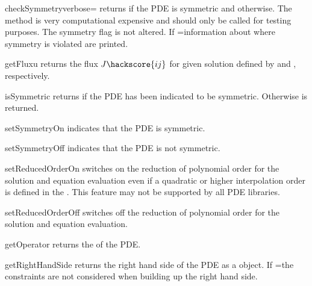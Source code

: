 \begin{methoddesc}[LinearPDE]{checkSymmetry}{verbose=\False}
returns \True if the PDE is symmetric and \False otherwise.
The method is very computational expensive and should only be
called for testing purposes. The symmetry flag is not altered.
If =\True information about where symmetry is violated
are printed.
\end{methoddesc}

\begin{methoddesc}[LinearPDE]{getFlux}{u}
returns the flux $J\hackscore{ij}$  for given solution 
defined by  and , respectively.
\end{methoddesc}


\begin{methoddesc}[LinearPDE]{isSymmetric}{}
returns \True if the PDE has been indicated to be symmetric.
Otherwise \False is returned.
\end{methoddesc}

\begin{methoddesc}[LinearPDE]{setSymmetryOn}{}
indicates that the PDE is symmetric.
\end{methoddesc}

\begin{methoddesc}[LinearPDE]{setSymmetryOff}{}
indicates that the PDE is not symmetric.
\end{methoddesc}

\begin{methoddesc}[LinearPDE]{setReducedOrderOn}{}
switches on the reduction of polynomial order for the solution and equation evaluation even if
a quadratic or higher interpolation order is defined in the \Domain. This feature may not
be supported by all PDE libraries.
\end{methoddesc}

\begin{methoddesc}[LinearPDE]{setReducedOrderOff}{}
switches off the reduction of polynomial order for the solution and
equation evaluation.
\end{methoddesc}

\begin{methoddesc}[LinearPDE]{getOperator}{}
returns the \Operator of the PDE.
\end{methoddesc}

\begin{methoddesc}[LinearPDE]{getRightHandSide}{}
returns the right hand side of the PDE as a \Data object. If
=\True the constraints are not considered
when building up the right hand side.
\end{methoddesc}

